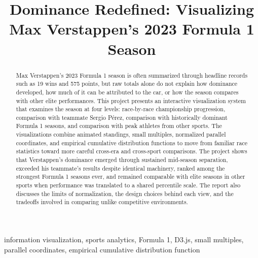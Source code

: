 \documentclass[conference]{IEEEtran}
\begin{document}
\title{Dominance Redefined: Visualizing Max Verstappen's 2023 Formula 1 Season}

\author{
}

\maketitle

\begin{abstract}
Max Verstappen's 2023 Formula 1 season is often summarized through headline records such as 19 wins and 575 points, but raw totals alone do not explain how dominance developed, how much of it can be attributed to the car, or how the season compares with other elite performances. This project presents an interactive visualization system that examines the season at four levels: race-by-race championship progression, comparison with teammate Sergio P\'erez, comparison with historically dominant Formula 1 seasons, and comparison with peak athletes from other sports. The visualizations combine animated standings, small multiples, normalized parallel coordinates, and empirical cumulative distribution functions to move from familiar race statistics toward more careful cross-era and cross-sport comparisons. The project shows that Verstappen's dominance emerged through sustained mid-season separation, exceeded his teammate's results despite identical machinery, ranked among the strongest Formula 1 seasons ever, and remained comparable with elite seasons in other sports when performance was translated to a shared percentile scale. The report also discusses the limits of normalization, the design choices behind each view, and the tradeoffs involved in comparing unlike competitive environments.
\end{abstract}

\begin{IEEEkeywords}
information visualization, sports analytics, Formula 1, D3.js, small multiples, parallel coordinates, empirical cumulative distribution function
\end{IEEEkeywords}
\end{document}
